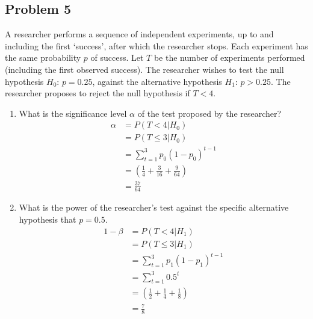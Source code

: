 \documentclass{article}
\newcommand{\1}{\mathbf{1}}
\begin{document}
\subsection*{Problem 5}
A researcher performs a sequence of independent experiments, up to and including the first `success', after which the researcher stops. Each experiment has the same probability $p$ of success. Let $T$ be the number of experiments  performed (including the first observed success). The researcher wishes to test the null hypothesis $H_0$: $p=0.25$, against the alternative hypothesis $H_1$:  $p>0.25$. The researcher proposes to reject the null hypothesis if $T<4$.
\begin{enumerate}
    \item  What is the significance level $\alpha$ of the test proposed by the researcher?
    \begin{align*}
        \alpha &= P(T<4|H_0) \\
        &= P(T\leq 3 | H_0) \\
        &= \sum_{t=1}^3 p_0(1-p_0)^{t-1} \\
        &= \left(\frac{1}{4} + \frac{3}{16} + \frac{9}{64} \right) \\
        &= \frac{37}{64}
    \end{align*}
    
    \item What is the power of the researcher's test against the specific alternative hypothesis that $p=0.5$.
     \begin{align*}
        1- \beta &= P(T<4|H_1) \\
        &= P(T\leq 3 | H_1) \\
        &= \sum_{t=1}^3 p_1(1-p_1)^{t-1} \\
        &= \sum_{t=1}^3 0.5^t \\
        &= \left(\frac{1}{2} + \frac{1}{4} + \frac{1}{8} \right) \\
        &= \frac{7}{8}
    \end{align*}
    

\end{enumerate}
\end{document}
